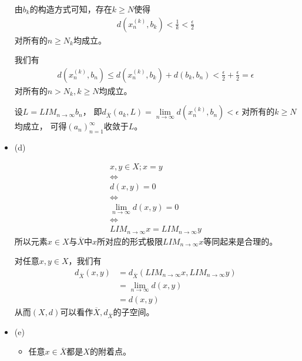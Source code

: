 \documentclass{article}
\begin{document}
\begin{itemize}
        由$b_k$的构造方式可知，存在$k \geq N$使得
        \begin{align*}
          d(x_n^{(k)}, b_k) < \frac{1}{k} < \frac{\epsilon}{2}
        \end{align*}
        对所有的$n \geq N_k$均成立。

        我们有
        \begin{align*}
          d(x_n^{(k)}, b_n) \leq d(x_n^{(k)}, b_k) + d(b_k, b_n) < \frac{\epsilon}{2} + \frac{\epsilon}{2} = \epsilon
        \end{align*}
        对所有的$n > N_k, k \geq N$均成立。

        设$L = LIM_{n \to \infty} b_n$，
        即$d_{\overline{X}}(a_k, L) = \lim\limits_{n \to \infty} d(x_n^{(k)}, b_n) < \epsilon$
        对所有的$k \geq N$均成立，
        可得$(a_n)_{n=1}^\infty$收敛于$L$。

  \item (d)

        \begin{align*}
          x, y \in X; x = y                      \\
          \Leftrightarrow                        \\
          d(x, y) = 0                            \\
          \Leftrightarrow                        \\
          \lim\limits_{n \to \infty} d(x, y) = 0 \\
          \Leftrightarrow                        \\
          LIM_{n \to \infty} x = LIM_{n \to \infty} y
        \end{align*}
        所以元素$x \in X$与$\overline{X}$中$x$所对应的形式极限$LIM_{n \to \infty} x$等同起来是合理的。

        对任意$x, y \in X$，我们有
        \begin{align*}
          d_{\overline{X}} (x, y) & = d_{\overline{X}} (LIM_{n \to \infty} x, LIM_{n \to \infty} y) \\
                                  & = \lim\limits_{n \to \infty} d(x, y)                            \\
                                  & = d(x, y)
        \end{align*}
        从而$(X, d)$可以看作$\overline{X}, d_{\overline{X}}$的子空间。
  \item (e)

        \begin{itemize}
          \item 任意$x \in \overline{X}$都是$X$的附着点。


\end{itemize}
\end{itemize}
\end{document}
